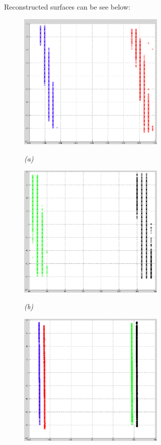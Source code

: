 

Reconstructed surfaces can be see below:

\begin{figure}[htb]
  \begin{minipage}[t]{2.75in}
    \centering
    \centerline{\mbox{\includegraphics[width=2.75in]{data_extraction/images/surface_plane/superior_comparison/Surface1_2.eps}}}
    \centerline{\emph{(a)}}
  \end{minipage}\medskip
  \begin{minipage}[t]{2.75in}
    \centering
    \centerline{\mbox{\includegraphics[width=2.75in]{data_extraction/images/surface_plane/inferior_comparison/Surface3_4.eps}}}
    \centerline{\emph{(b)}}
  \end{minipage}
  \begin{minipage}[t]{2.75in}
    \centering
    \centerline{\mbox{\includegraphics[width=2.75in]{data_extraction/images/surface_plane/Surface1_2_3_4.eps}}}

\end{minipage}
\end{figure}
